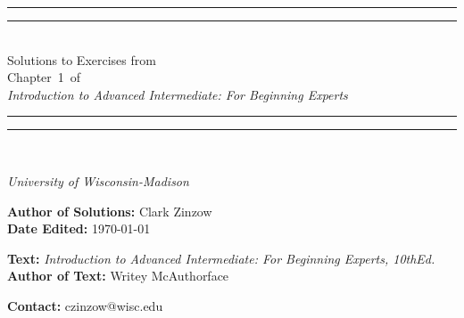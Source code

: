\documentclass[twoside, titlepage]{amsart}
\makeatletter
\newcommand{\authorName}{Clark Zinzow}  %
\newcommand{\bookName}{Introduction to Advanced Intermediate: For Beginning Experts}  %
\newcommand{\bookEdition}{10th}
\newcommand{\sectionType}{Chapter} %
\newcommand{\sectionNumber}{1} %
\newcommand{\startDate}{\today}
\newcommand{\bookAuthor}{Writey McAuthorface}  %
\newcommand{\universityName}{University of Wisconsin-Madison}
\newcommand{\authorEmail}{czinzow@wisc.edu}  %
\theoremstyle{plain} %
\theoremstyle{definition}
\theoremstyle{remark}
\theoremstyle{notation}
\makeatother
\begin{document}
	
	\begin{titlepage}
		\centering
		\vspace*{\baselineskip}
		\rule{\textwidth}{1.6pt}\vspace*{-\baselineskip}\vspace*{2pt}
		\rule{\textwidth}{0.4pt}\\[\baselineskip]
		\Huge Solutions to Exercises from \\
			\sectionType\ \sectionNumber\ of \\
			\emph{\bookName}
		\\
		\rule{\textwidth}{0.4pt}\vspace*{-\baselineskip}\vspace*{3pt}
		\rule{\textwidth}{1.6pt}\\[\baselineskip]
		\vspace*{3\baselineskip}
		\huge  \par
		\vspace*{\baselineskip}
		{\itshape \universityName \par}
		\vspace*{3\baselineskip}
		\huge \textbf{Author of Solutions:} { \authorName} \\
		\vspace*{\baselineskip}
		\huge \textbf{Date Edited:} { \startDate } \par
		\vspace*{\baselineskip}
		\huge \textbf{Text:} { \emph{\bookName,  \bookEdition \:Ed.}} \\
		\vspace*{\baselineskip}
		\huge \textbf{Author of Text:} { \bookAuthor } \par
		\vspace*{\baselineskip}
		\huge \textbf{Contact:} { \authorEmail } \\
	\end{titlepage}
	
\end{document}
